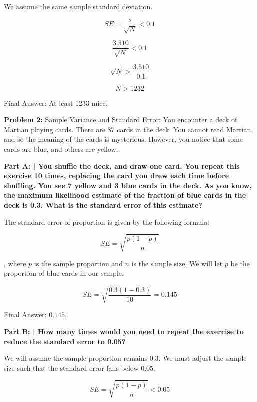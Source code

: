 \documentclass{article}
\begin{document}
 We assume the same sample standard deviation.\newline
 
 \[SE=\frac{s}{\sqrt{N}} < 0.1\]
  
 \[\frac{3.510}{\sqrt{N}} < 0.1\]
  
 \[\sqrt{N} > \frac{3.510}{0.1}\]

 \[N > 1232\]
 
 Final Answer: At least 1233 mice.\newline
 
 \newpage
 
 \noindent\makebox[\linewidth]{\rule{\paperwidth}{0.4pt}}\newline
 
 \begin{center}
      \Large\textbf{Problem 2:} Sample Variance and Standard Error: You encounter a deck of Martian playing cards. There are 87 cards in the deck. You cannot read Martian, and so the meaning of the cards is mysterious. However, you notice that some cards are blue, and others are yellow.\par
 \end{center}
 
 \textbf{Part A: | You shuffle the deck, and draw one card. You repeat this exercise 10 times, replacing the card you drew each time before shuffling. You see 7 yellow and 3 blue cards in the deck. As you know, the maximum likelihood estimate of the fraction of blue cards in the deck is 0.3. What is the standard error of this estimate?}\newline
 
 The standard error of proportion is given by the following formula:
 
 \[SE = \sqrt{\frac{p(1-p)}{n}}\]
 
 , where $p$ is the sample proportion and $n$ is the sample size. We will let $p$ be the proportion of blue cards in our sample. 
 
 \[SE = \sqrt{\frac{0.3(1-0.3)}{10}} = 0.145\]
 
 Final Answer: $0.145$.\newline
 
 \textbf{Part B: | How many times would you need to repeat the exercise to reduce the standard error to 0.05?}\newline
 
 We will assume the sample proportion remains 0.3. We must adjust the sample size such that the standard error falls below 0.05.
 
 \[SE = \sqrt{\frac{p(1-p)}{n}} < 0.05\]
 
\end{document}
